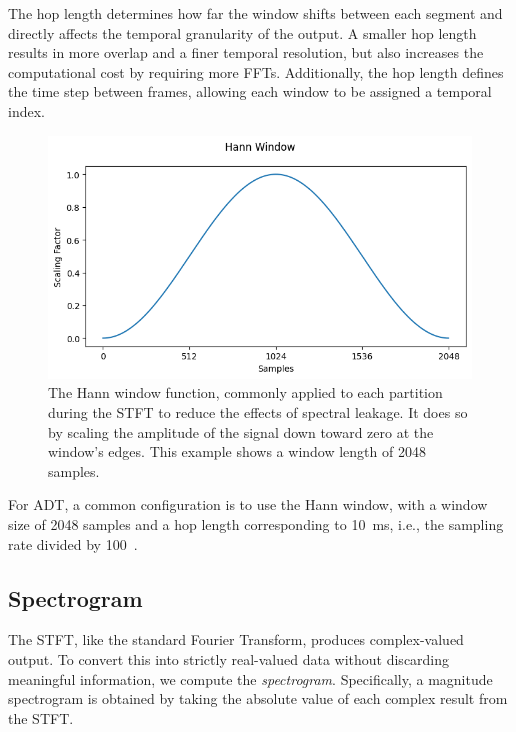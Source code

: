 The hop length determines how far the window shifts between each segment and directly affects the temporal granularity of the output. A smaller hop length results in more overlap and a finer temporal resolution, but also increases the computational cost by requiring more \glspl{FFT}. Additionally, the hop length defines the time step between frames, allowing each window to be assigned a temporal index.

\begin{figure}[H]
    \centering
    \includegraphics[scale=0.8]{figures/hann}
    \caption{The Hann window function, commonly applied to each partition during the \gls{STFT} to reduce the effects of spectral leakage. It does so by scaling the amplitude of the signal down toward zero at the window's edges. This example shows a window length of 2048 samples.}
    \label{HannWindowFigure}
\end{figure}

For \gls{ADT}, a common configuration is to use the Hann window, with a window size of 2048 samples and a hop length corresponding to 10~ms, i.e., the sampling rate divided by 100~\cite{8350302, vogl2016recurrent,vogl2018multiinstrumentdrumtranscription, signals4040042}.

\subsection{Spectrogram}

The \gls{STFT}, like the standard Fourier Transform, produces complex-valued output. To convert this into strictly real-valued data without discarding meaningful information, we compute the \textit{spectrogram}. Specifically, a magnitude spectrogram is obtained by taking the absolute value of each complex result from the \gls{STFT}.


